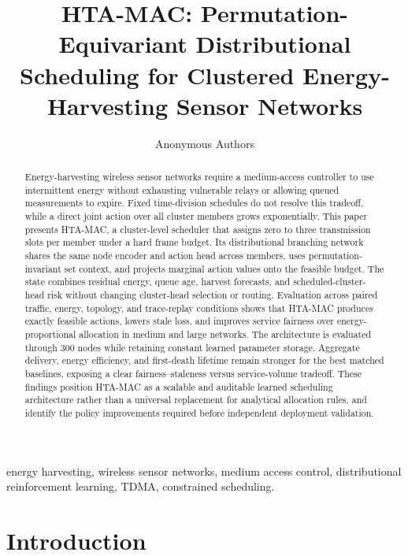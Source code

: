 \documentclass[journal]{IEEEtran}
\newcommand{\method}{HTA-MAC}
\begin{document}
\title{HTA-MAC: Permutation-Equivariant Distributional Scheduling for Clustered Energy-Harvesting Sensor Networks}

\author{Anonymous Authors}

\maketitle

\begin{abstract}
Energy-harvesting wireless sensor networks require a medium-access controller
to use intermittent energy without exhausting vulnerable relays or allowing
queued measurements to expire. Fixed time-division schedules do not resolve
this tradeoff, while a direct joint action over all cluster members grows
exponentially. This paper presents \method, a cluster-level scheduler that
assigns zero to three transmission slots per member under a hard frame budget.
Its distributional branching network shares the same node encoder and action
head across members, uses permutation-invariant set context, and projects
marginal action values onto the feasible budget. The state combines residual
energy, queue age, harvest forecasts, and scheduled-cluster-head risk without
changing cluster-head selection or routing. Evaluation across paired traffic,
energy, topology, and trace-replay conditions shows that \method{} produces
exactly feasible actions, lowers stale loss, and improves service fairness over
energy-proportional allocation in medium and large networks. The architecture
is evaluated through 300 nodes while retaining constant learned parameter
storage. Aggregate delivery, energy efficiency, and first-death
lifetime remain stronger for the best matched baselines, exposing a clear
fairness--staleness versus service-volume tradeoff. These findings position
\method{} as a scalable and auditable learned scheduling architecture rather
than a universal replacement for analytical allocation rules, and identify
the policy improvements required before independent deployment validation.
\end{abstract}

\begin{IEEEkeywords}
energy harvesting, wireless sensor networks, medium access control,
distributional reinforcement learning, TDMA, constrained scheduling.
\end{IEEEkeywords}

\section{Introduction}
\end{document}
